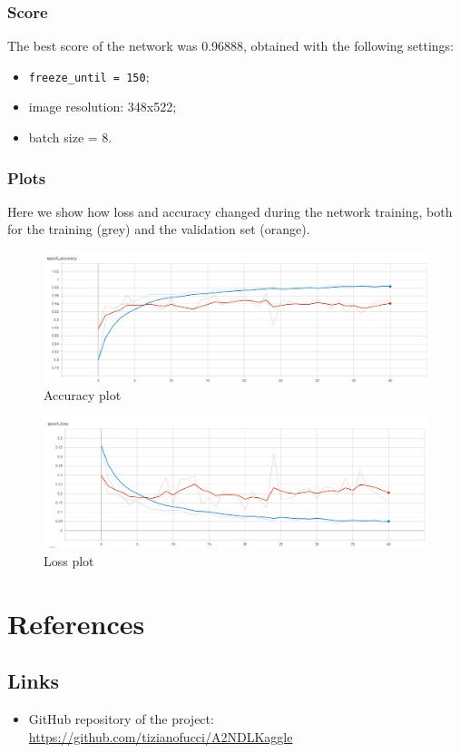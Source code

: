 \documentclass[12pt,a4paper]{report}
\begin{document}
\subsection{Score}
	The best score of the network was 0.96888, obtained with the following settings:
	\begin{itemize}
		\item	\texttt{freeze\_until = 150};
		\item image resolution: 348x522;
		\item batch size = 8.
	\end{itemize}
\subsection{Plots}
Here we show how loss and accuracy changed during the network training, both for the training (grey) and the validation set (orange).
\begin{figure}[H]
	\includegraphics[scale = 0.5, center]{ResNet accuracy}
	\caption{Accuracy plot}
\end{figure}
\begin{figure}[H]
	\includegraphics[scale = 0.5, center]{ResNet loss}
	\caption{Loss plot}
\end{figure}
		
		
	
	\chapter{References}
		\section{Links}

\begin{itemize}
	\item GitHub repository of the project: \url{https://github.com/tizianofucci/A2NDLKaggle}
\end{itemize}
\end{document}
